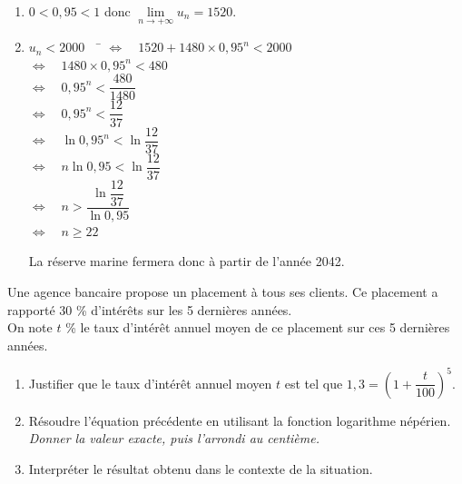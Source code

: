 \documentclass[a4paper,11pt,exos]{nsi} %
\begin{document}
{\begin{enumerate}
        \item $0<0,95<1$ donc $\lim\limits_{n\to+\infty}u_n=1520$.
        \item \begin{tabbing}
            $u_n<2000\quad$ \= $\iff \quad 1520+1480\times 0,95^n<2000$\\
            \> $\iff \quad 1480\times 0,95^n<480$\\
            \> $\iff \quad 0,95^n<\dfrac{480}{1480}$\\[.5em]
            \> $\iff \quad 0,95^n<\dfrac{12}{37}$\\[.5em]
            \> $\iff \quad \ln 0,95^n<\ln \dfrac{12}{37}$\\[.5em]
            \> $\iff \quad n\ln 0,95<\ln \dfrac{12}{37}$\\[.5em]
            \> $\iff \quad n>\dfrac{\ln \dfrac{12}{37}}{\ln 0,95}$\\[.5em]
            \> $\iff \quad n\geqslant 22$
        \end{tabbing}
        La réserve marine fermera donc à partir de l'année 2042.
    \end{enumerate}
}


\exo{}
Une agence bancaire propose un placement à tous ses clients. Ce placement a rapporté 30 \% d'intérêts sur les 5 dernières années.\\
On note $t$ \% le taux d'intérêt annuel moyen de ce placement sur ces 5 dernières années.
\begin{enumerate}
    \item Justifier que le taux d'intérêt annuel moyen $t$ est tel que $1,3=\left(1+\dfrac{t}{100}\right)^5$.
    \item Résoudre l'équation précédente en utilisant la fonction logarithme népérien. \textit{Donner la valeur exacte, puis l'arrondi au centième.}
    \item Interpréter le résultat obtenu dans le contexte de la situation.
\end{enumerate}
\end{document}
